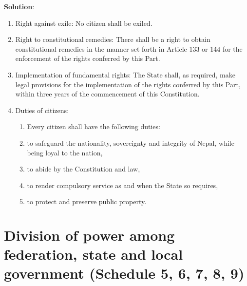 \documentclass[
  openany]{book}
\newenvironment{solution}{ {\bfseries Solution}:}{}
\begin{document}
\begin{questions}
\begin{solution}
\begin{enumerate}
\item Right against exile: No citizen shall be exiled.
\item Right to constitutional remedies: There shall be a right to obtain constitutional remedies in the manner set forth in Article 133 or 144 for the enforcement of the rights conferred by this Part.
\item Implementation of fundamental rights: The State shall, as required, make legal provisions for the implementation of the rights conferred by this Part, within three years of the commencement of this Constitution.
\item Duties of citizens:
\begin{enumerate}
\item[] Every citizen shall have the following duties:
\item to safeguard the nationality, sovereignty and integrity of Nepal, while being loyal to the nation,
\item to abide by the Constitution and law,
\item to render compulsory service as and when the State so requires,
\item to protect and preserve public property.
\end{enumerate}
\end{enumerate}
\end{solution}


\end{questions}

\hypertarget{division-of-power-among-federation-state-and-local-government-schedule-5-6-7-8-9}{%
\section{Division of power among federation, state and local government (Schedule 5, 6, 7, 8, 9)}\label{division-of-power-among-federation-state-and-local-government-schedule-5-6-7-8-9}}


\begingroup\fontsize{10}{12}\selectfont
\end{document}
